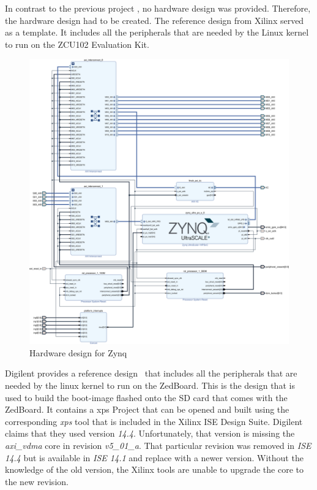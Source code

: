 In contrast to the previous project \cite{oldrepo}, no hardware design was provided. Therefore, the hardware design had to be created. The reference design \cite{TRDReferenceDesign} from Xilinx served as a template. It includes all the peripherals that are needed by the Linux kernel to run on the ZCU102 Evaluation Kit.

\begin{figure}[htbp]
    \centering
    \includegraphics[width=1\textwidth]{images/hw-design-zynq.png}
    \caption{\label{fig:hwzynq} Hardware design for Zynq}
\end{figure}




Digilent provides a reference design~\cite{DigilentReferenceDesign} that
includes all the peripherals that are needed by the linux kernel to run on the
ZedBoard.
This is the design that is used to build the boot-image flashed onto the SD
card that comes with the ZedBoard.
It contains a \gls{xps} Project that can be opened and built using
the corresponding \emph{xps} tool that is included in the Xilinx ISE Design
Suite.
Digilent claims that they used version \emph{14.4}. Unfortunately, that version
is missing the \emph{axi\_vdma} core in revision \emph{v5\_01\_a}.
That particular revision was removed in \emph{ISE 14.4} but is available in
\emph{ISE 14.1} and replace with a newer version.
Without the knowledge of the old version, the Xilinx tools are unable to upgrade
the core to the new revision.

